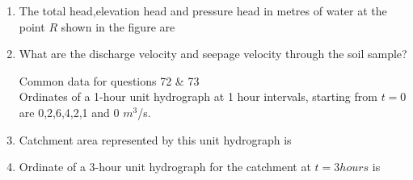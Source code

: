 \begin {enumerate}[start=70]
\item %
The total head,elevation head and pressure head in metres of water at the point $R$ shown in the figure are
\begin{enumerate}
\end{enumerate}
\item %
What are the discharge velocity and seepage velocity through the soil sample?
\begin{enumerate}
\end{enumerate}
Common data for questions 72 \& 73 \\
Ordinates of a 1-hour unit hydrograph at 1 hour intervals, starting from $t=0$ are 0,2,6,4,2,1 and 0 $m^3$/s.
\item %
Catchment area represented by this unit hydrograph is 
\begin{enumerate}
\end{enumerate}
\item %
Ordinate of a 3-hour unit hydrograph for the catchment at $t=3 hours$ is 
\begin{enumerate}
\end{enumerate}
\end{enumerate}
